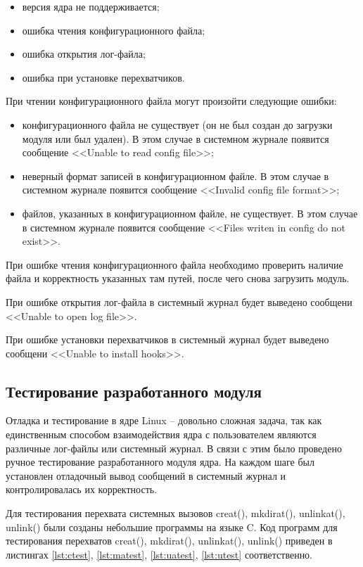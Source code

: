 \documentclass[a4paper,14pt]{article}
\begin{document}
\begin{itemize}
	\item версия ядра не поддерживается;
	\item ошибка чтения конфигурационного файла;
	\item ошибка открытия лог-файла;
	\item ошибка при установке перехватчиков.
\end{itemize}

При чтении конфигурационного файла могут произойти следующие ошибки:

\begin{itemize}
	\item конфигурационного файла не существует (он не был создан до загрузки модуля или был удален). В этом случае в системном журнале появится сообщение <<Unable to read config file>>;
	\item неверный формат записей в конфигурационном файле. В этом случае в системном журнале появится сообщение <<Invalid config file format>>;
	\item файлов, указанных в конфигурационном файле, не существует. В этом случае в системном журнале появится сообщение <<Files writen in config do not exist>>.
\end{itemize}

При ошибке чтения конфигурационного файла необходимо проверить наличие файла и корректность указанных там путей, после чего снова загрузить модуль.

При ошибке открытия лог-файла в системный журнал будет выведено сообщени <<Unable to open log file>>.

При ошибке установки перехватчиков в системный журнал будет выведено сообщени <<Unable to install hooks>>.

\subsection{Тестирование разработанного модуля}

Отладка и тестирование в ядре Linux -- довольно сложная задача, так как единственным способом взаимодействия ядра с пользователем являются различные лог-файлы или системный журнал. В связи с этим было проведено ручное тестирование разработанного модуля ядра. На каждом шаге был установлен отладочный вывод сообщений в системный журнал и контролировалась их корректность.

Для тестирования перехвата системных вызовов creat(), mkdirat(), unlinkat(), unlink() были созданы небольшие программы на языке C. Код программ для тестирования перехватов creat(), mkdirat(), unlinkat(), unlink() приведен в листингах \ref{lst:ctest}, \ref{lst:matest}, \ref{lst:uatest}, \ref{lst:utest} соответственно.
\end{document}
